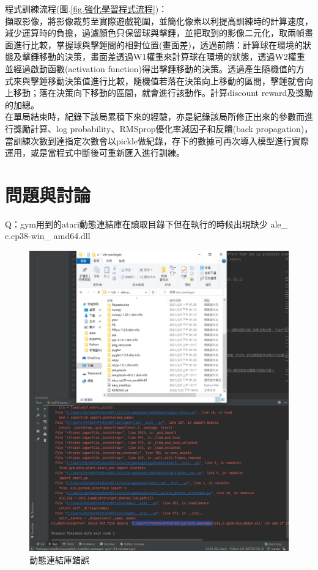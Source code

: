 \documentclass[14pt,a4paper]{report}  %
\begin{document}
程式訓練流程(圖.\ref{fig.強化學習程式流程})：\\
 擷取影像，將影像裁剪至實際遊戲範圍，並簡化像素以利提高訓練時的計算速度，減少運算時的負擔，過濾顏色只保留球與擊錘，並把取到的影像二元化，取兩幀畫面進行比較，掌握球與擊錘間的相對位置(畫面差)，透過前饋：計算球在環境的狀態及擊錘移動的決策，畫面差透過W1權重來計算球在環境的狀態，透過W2權重並經過啟動函數(activation function)得出擊錘移動的決策。透過產生隨機值的方式來與擊錘移動決策值進行比較，隨機值若落在決策向上移動的區間，擊錘就會向上移動；落在決策向下移動的區間，就會進行該動作。計算discount reward及獎勵的加總。\\

 在單局結束時，紀錄下該局累積下來的經驗，亦是紀錄該局所修正出來的參數而進行獎勵計算、log probability、RMSprop優化率減因子和反饋(back propagation)，當訓練次數到達指定次數會以pickle做紀錄，存下的數據可再次導入模型進行實際運用，或是當程式中斷後可重新匯入進行訓練。\\
\newpage
\chapter{問題與討論}
Q：gym用到的atari動態連結庫在讀取目錄下但在執行的時候出現缺少 ale\_ c.cp38-win\_ amd64.dll
\begin{figure}[hbt!]
\begin{center}
\includegraphics[width=15cm]{Q_dll}
\caption{\Large 動態連結庫錯誤}
\label{fig.動態連結庫錯誤}
\end{center}
\end{figure}
\end{document}
